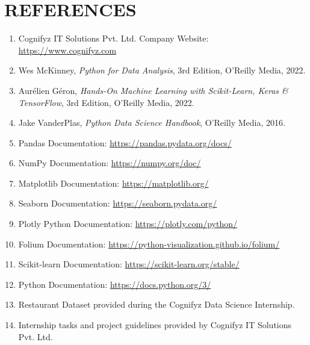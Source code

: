 \documentclass[12pt,a4paper]{report}
\begin{document}
\chapter*{REFERENCES}

\begin{enumerate}

\item Cognifyz IT Solutions Pvt. Ltd. Company Website: \url{https://www.cognifyz.com}

\item Wes McKinney, \textit{Python for Data Analysis}, 3rd Edition, O'Reilly Media, 2022.

\item Aurélien Géron, \textit{Hands-On Machine Learning with Scikit-Learn, Keras \& TensorFlow}, 3rd Edition, O'Reilly Media, 2022.

\item Jake VanderPlas, \textit{Python Data Science Handbook}, O'Reilly Media, 2016.

\item Pandas Documentation: \url{https://pandas.pydata.org/docs/}

\item NumPy Documentation: \url{https://numpy.org/doc/}

\item Matplotlib Documentation: \url{https://matplotlib.org/}

\item Seaborn Documentation: \url{https://seaborn.pydata.org/}

\item Plotly Python Documentation: \url{https://plotly.com/python/}

\item Folium Documentation: \url{https://python-visualization.github.io/folium/}

\item Scikit-learn Documentation: \url{https://scikit-learn.org/stable/}

\item Python Documentation: \url{https://docs.python.org/3/}

\item Restaurant Dataset provided during the Cognifyz Data Science Internship.

\item Internship tasks and project guidelines provided by Cognifyz IT Solutions Pvt. Ltd.

\end{enumerate}
\end{document}
